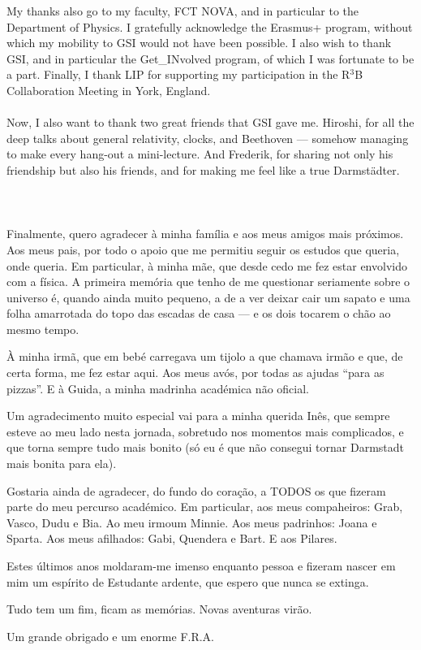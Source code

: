 \begin{ntacknowledgements}
My thanks also go to my faculty, FCT NOVA, and in particular to the Department of Physics. I gratefully acknowledge the Erasmus+ program, without which my mobility to GSI would not have been possible. I also wish to thank GSI, and in particular the Get\_INvolved program, of which I was fortunate to be a part. Finally, I thank LIP for supporting my participation in the R$^3$B Collaboration Meeting in York, England.  
\\
\\
Now, I also want to thank two great friends that GSI gave me. Hiroshi, for all the deep talks about general relativity, clocks, and Beethoven — somehow managing to make every hang-out a mini-lecture. And Frederik, for sharing not only his friendship but also his friends, and for making me feel like a true Darmstädter.
\\
\\
\\
\\
Finalmente, quero agradecer à minha família e aos meus amigos mais próximos. Aos meus pais, por todo o apoio que me permitiu seguir os estudos que queria, onde queria. Em particular, à minha mãe, que desde cedo me fez estar envolvido com a física. A primeira memória que tenho de me questionar seriamente sobre o universo é, quando ainda muito pequeno, a de a ver deixar cair um sapato e uma folha amarrotada do topo das escadas de casa — e os dois tocarem o chão ao mesmo tempo.

À minha irmã, que em bebé carregava um tijolo a que chamava irmão e que, de certa forma, me fez estar aqui. Aos meus avós, por todas as ajudas “para as pizzas”. E à Guida, a minha madrinha académica não oficial.

Um agradecimento muito especial vai para a minha querida Inês, que sempre esteve ao meu lado nesta jornada, sobretudo nos momentos mais complicados, e que torna sempre tudo mais bonito (só eu é que não consegui tornar Darmstadt mais bonita para ela).

Gostaria ainda de agradecer, do fundo do coração, a TODOS os que fizeram parte do meu percurso académico. 
Em particular, aos meus compaheiros: Grab, Vasco, Dudu e Bia. Ao meu irmoum Minnie. Aos meus padrinhos: Joana e Sparta. Aos meus afilhados: Gabi, Quendera e Bart. E aos Pilares.

Estes últimos anos moldaram-me imenso enquanto pessoa e fizeram nascer em mim um espírito de Estudante ardente, que espero que nunca se extinga.

Tudo tem um fim, ficam as memórias. Novas aventuras virão.

Um grande obrigado e um enorme F.R.A.


\end{ntacknowledgements}